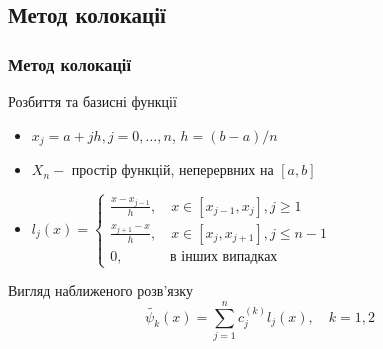 \documentclass{beamer}
\numberwithin{equation}{section}
\begin{document}
	\subsection{Метод колокації}
	\begin{frame}
		\frametitle{Метод колокації}
		
		\begin{block}{Розбиття та базисні функції}
			\begin{itemize}
			\item $x_{j}=a+j h, j=0, \ldots, n$, $h=(b-a) / n$
			\vspace{0.3cm}
			\item $X_{n}-$ простір функцій, неперервних на $[a, b]$
			\item $l_{j}(x)=\left\{
			\begin{array}{lc}
				\frac{x-x_{j-1}}{h}, \quad x \in\left[x_{j-1}, x_{j}\right], j \geq 1 \\
				\frac{x_{j+1}-x}{h}, \quad x \in\left[x_{j}, x_{j+1}\right], j \leq n-1 \\
				0, \qquad\quad \text { в інших випадках }
			\end{array}\right.$
		
			\end{itemize}
		\end{block}
		
		\begin{block}{Вигляд наближеного розв'язку}
		$$
		\tilde{\psi_k}(x)=\sum_{j=1}^{n} c^{(k)}_{j} l_{j}(x), \quad k = 1, 2
		$$
		\end{block}
		

	\end{frame}

	
\end{document}
